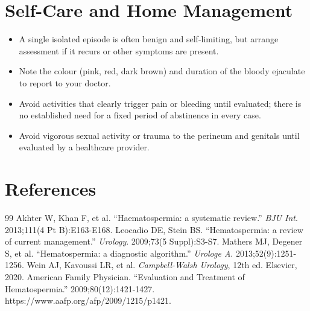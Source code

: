 \section*{Self-Care and Home Management}
\begin{itemize}
 \item A single isolated episode is often benign and self-limiting, but arrange assessment if it recurs or other symptoms are present.
 \item Note the colour (pink, red, dark brown) and duration of the bloody ejaculate to report to your doctor.
 \item Avoid activities that clearly trigger pain or bleeding until evaluated; there is no established need for a fixed period of abstinence in every case.
 \item Avoid vigorous sexual activity or trauma to the perineum and genitals until evaluated by a healthcare provider.
\end{itemize}

\section*{References}
\begin{thebibliography}{99}
 Akhter W, Khan F, et al. ``Haematospermia: a systematic review.'' \textit{BJU Int}. 2013;111(4 Pt B):E163-E168.
 Leocadio DE, Stein BS. ``Hematospermia: a review of current management.'' \textit{Urology}. 2009;73(5 Suppl):S3-S7.
 Mathers MJ, Degener S, et al. ``Hematospermia: a diagnostic algorithm.'' \textit{Urologe A}. 2013;52(9):1251-1256.
 Wein AJ, Kavoussi LR, et al. \textit{Campbell-Walsh Urology}, 12th ed. Elsevier, 2020.
 American Family Physician. ``Evaluation and Treatment of Hematospermia.'' 2009;80(12):1421-1427. https://www.aafp.org/afp/2009/1215/p1421.
\end{thebibliography}
